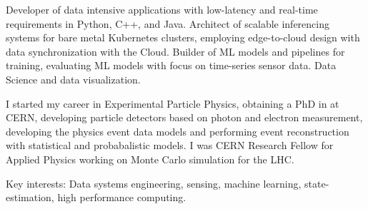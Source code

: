 

\begin{cvparagraph}

Developer of data intensive applications with low-latency and real-time 
requirements in Python, C++, and Java. Architect of scalable inferencing 
systems for bare metal Kubernetes clusters, employing edge-to-cloud 
design with data synchronization with the Cloud. Builder of ML models and pipelines for training, evaluating ML models with focus 
on time-series sensor data. Data Science and data visualization.

I started my career in Experimental Particle Physics, obtaining a PhD in at CERN, 
developing particle detectors based on photon and electron measurement, 
developing the physics event data models and performing event reconstruction 
with statistical and probabalistic models. I was CERN Research Fellow for Applied Physics working 
on Monte Carlo simulation for the LHC.

Key interests: Data systems engineering, sensing, machine learning, state-estimation, 
high performance computing.
\end{cvparagraph}